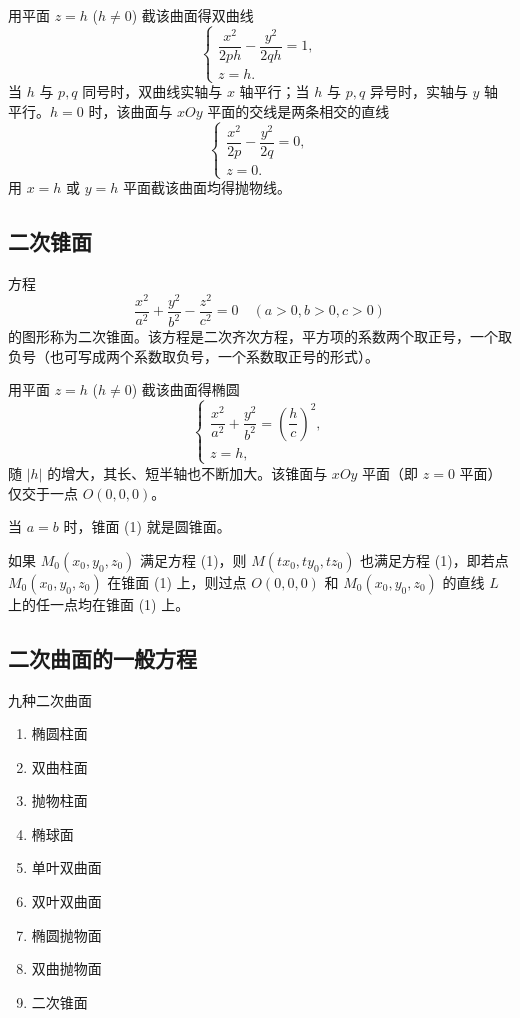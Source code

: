 用平面 $z = h$ ($h \neq 0$) 截该曲面得双曲线
\[
\begin{cases}
\dfrac{x^2}{2ph} - \dfrac{y^2}{2qh} = 1, \\
z = h.
\end{cases}
\]
当 $h$ 与 $p, q$ 同号时，双曲线实轴与 $x$ 轴平行；当 $h$ 与 $p, q$ 异号时，实轴与 $y$ 轴平行。$h = 0$ 时，该曲面与 $xOy$ 平面的交线是两条相交的直线
\[
\begin{cases}
\dfrac{x^2}{2p} - \dfrac{y^2}{2q} = 0, \\
z = 0.
\end{cases}
\]
用 $x = h$ 或 $y = h$ 平面截该曲面均得抛物线。

\subsection{二次锥面}
方程
\[
\frac{x^2}{a^2} + \frac{y^2}{b^2} - \frac{z^2}{c^2} = 0 \quad (a > 0, b > 0, c > 0)\tag{1}
\]
的图形称为二次锥面。该方程是二次齐次方程，平方项的系数两个取正号，一个取负号（也可写成两个系数取负号，一个系数取正号的形式）。

用平面 $z = h$ ($h \neq 0$) 截该曲面得椭圆
\[
\begin{cases}
\dfrac{x^2}{a^2} + \dfrac{y^2}{b^2} = \left(\dfrac{h}{c}\right)^2, \\
z = h,
\end{cases}
\]
随 $|h|$ 的增大，其长、短半轴也不断加大。该锥面与 $xOy$ 平面（即 $z = 0$ 平面）仅交于一点 $O(0, 0, 0)$。

当 $a = b$ 时，锥面 (1) 就是圆锥面。

如果 $M_0(x_0, y_0, z_0)$ 满足方程 (1)，则 $M(tx_0, ty_0, tz_0)$ 也满足方程 (1)，即若点 $M_0(x_0, y_0, z_0)$ 在锥面 (1) 上，则过点 $O(0, 0, 0)$ 和 $M_0(x_0, y_0, z_0)$ 的直线 $L$ 上的任一点均在锥面 (1) 上。

\subsection{二次曲面的一般方程}
九种二次曲面
\begin{enumerate}
    \item 椭圆柱面
    \item 双曲柱面
    \item 抛物柱面
    \item 椭球面
    \item 单叶双曲面
    \item 双叶双曲面
    \item 椭圆抛物面
    \item 双曲抛物面
    \item 二次锥面
\end{enumerate}
